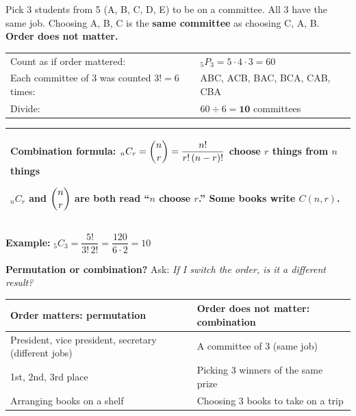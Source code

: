 \documentclass[11pt]{article}
\begin{document}

Pick 3 students from 5 (A, B, C, D, E) to be on a committee. All 3 have the same job.
Choosing A, B, C is the \textbf{same committee} as choosing C, A, B. \textbf{Order does not matter.}

\vspace{0.6em}
\begin{tabular}{@{}ll}
Count as if order mattered: & ${}_5P_3 = 5 \cdot 4 \cdot 3 = 60$\\
Each committee of 3 was counted $3! = 6$ times: & ABC, ACB, BAC, BCA, CAB, CBA\\
Divide: & $60 \div 6 = \mathbf{10}$ committees\\
\end{tabular}

\vspace{0.8em}
\renewcommand{\arraystretch}{1.3}
\begin{tabular}{|>{\raggedright\arraybackslash}p{6.7in}|}\hline
\rule{0pt}{2.4em}\textbf{Combination formula:} \qquad ${}_nC_r = \dbinom{n}{r} = \dfrac{n!}{r!\,(n - r)!}$ \qquad choose $r$ things from $n$ things\par\vspace{0.4em}
${}_nC_r$ and $\dbinom{n}{r}$ are both read ``$n$ choose $r$.'' Some books write $C(n, r)$.\\[0.4em] \hline
\end{tabular}

\vspace{0.4em}
\textbf{Example:} \qquad ${}_5C_3 = \dfrac{5!}{3!\,2!} = \dfrac{120}{6 \cdot 2} = 10$

\vspace{1em}
\textbf{Permutation or combination?} Ask: \textit{If I switch the order, is it a different result?}

\vspace{0.3em}
\begin{tabular}{|>{\raggedright\arraybackslash}p{3.6in}|>{\raggedright\arraybackslash}p{2.9in}|}\hline
\textbf{Order matters: permutation} & \textbf{Order does not matter: combination}\\ \hline
President, vice president, secretary (different jobs) & A committee of 3 (same job)\\ \hline
1st, 2nd, 3rd place & Picking 3 winners of the same prize\\ \hline
Arranging books on a shelf & Choosing 3 books to take on a trip\\ \hline
\end{tabular}
\end{document}
